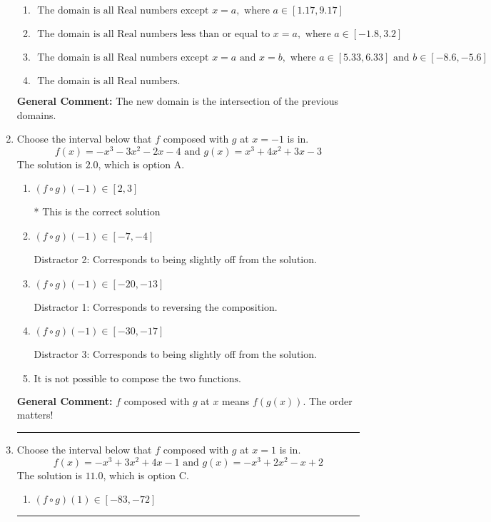 \documentclass{extbook}[14pt]
\newcommand{\litem}[1]{\item #1

\rule{\textwidth}{0.4pt}}
\begin{document}
\begin{enumerate}
{\begin{enumerate}[label=\Alph*.]
\item \( \text{ The domain is all Real numbers except } x = a, \text{ where } a \in [1.17, 9.17] \)


\item \( \text{ The domain is all Real numbers less than or equal to } x = a, \text{ where } a \in [-1.8, 3.2] \)


\item \( \text{ The domain is all Real numbers except } x = a \text{ and } x = b, \text{ where } a \in [5.33, 6.33] \text{ and } b \in [-8.6, -5.6] \)


\item \( \text{ The domain is all Real numbers. } \)


\end{enumerate}

\textbf{General Comment:} The new domain is the intersection of the previous domains.
}
\litem{
Choose the interval below that $f$ composed with $g$ at $x=-1$ is in.
\[ f(x) = -x^{3} -3 x^{2} -2 x -4 \text{ and } g(x) = x^{3} +4 x^{2} +3 x -3 \]The solution is \( 2.0 \), which is option A.\begin{enumerate}[label=\Alph*.]
\item \( (f \circ g)(-1) \in [2, 3] \)

* This is the correct solution
\item \( (f \circ g)(-1) \in [-7, -4] \)

 Distractor 2: Corresponds to being slightly off from the solution.
\item \( (f \circ g)(-1) \in [-20, -13] \)

 Distractor 1: Corresponds to reversing the composition.
\item \( (f \circ g)(-1) \in [-30, -17] \)

 Distractor 3: Corresponds to being slightly off from the solution.
\item \( \text{It is not possible to compose the two functions.} \)


\end{enumerate}

\textbf{General Comment:} $f$ composed with $g$ at $x$ means $f(g(x))$. The order matters!
}
\litem{
Choose the interval below that $f$ composed with $g$ at $x=1$ is in.
\[ f(x) = -x^{3} +3 x^{2} +4 x -1 \text{ and } g(x) = -x^{3} +2 x^{2} -x + 2 \]The solution is \( 11.0 \), which is option C.\begin{enumerate}[label=\Alph*.]
\item \( (f \circ g)(1) \in [-83, -72] \)


\end{enumerate}}
\end{enumerate}
\end{document}
